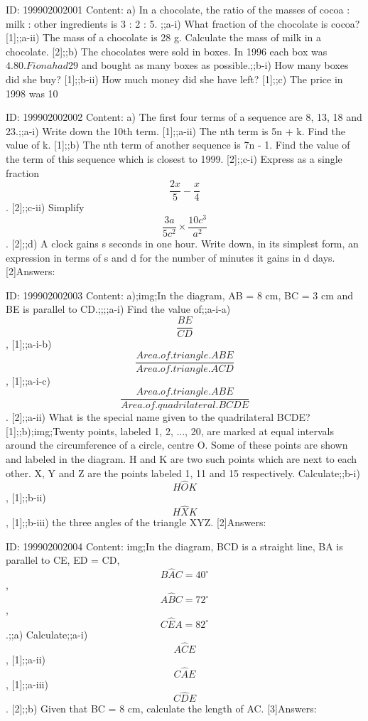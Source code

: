 \documentclass{article}
\begin{document}
ID: 199902002001
Content:
a) In a chocolate, the ratio of the masses of cocoa : milk : other ingredients is 3 : 2 : 5. ;;a-i) What fraction of the chocolate is cocoa? [1];;a-ii) The mass of a chocolate is 28 g. Calculate the mass of milk in a chocolate. [2];;b) The chocolates were sold in boxes. In 1996 each box was $4.80. Fiona had $29 and bought as many boxes as possible.;;b-i) How many boxes did she buy? [1];;b-ii) How much money did she have left? [1];;c) The price in 1998 was 10%

ID: 199902002002
Content:
a) The first four terms of a sequence are 8, 13, 18 and 23.;;a-i) Write down the 10th term. [1];;a-ii) The nth term is 5n + k. Find the value of k. [1];;b) The nth term of another sequence is 7n - 1. Find the value of the term of this sequence which is closest to 1999. [2];;c-i) Express as a single fraction $$\frac{2x}{5}-\frac{x}{4}$$. [2];;c-ii) Simplify $$\frac{3a}{5c^{2}} \times \frac{10c^{3}}{a^{2}}$$. [2];;d) A clock gains s seconds in one hour. Write down, in its simplest form, an expression in terms of s and d for the number of minutes it gains in d days. [2]Answers:

ID: 199902002003
Content:
a);img;In the diagram, AB = 8 cm, BC = 3 cm and BE is parallel to CD.;;;;a-i) Find the value of;;a-i-a) $$\frac{BE}{CD}$$, [1];;a-i-b) $$\frac{Area.of.triangle.ABE}{Area.of.triangle.ACD}$$, [1];;a-i-c) $$\frac{Area.of.triangle.ABE}{Area.of.quadrilateral.BCDE}$$. [2];;a-ii) What is the special name given to the quadrilateral BCDE? [1];;b);img;Twenty points, labeled 1, 2, ..., 20, are marked at equal intervals around the circumference of a circle, centre O. Some of these points are shown and labeled in the diagram. H and K are two such points which are next to each other. X, Y and Z are the points labeled 1, 11 and 15 respectively. Calculate;;b-i) $$H \hat OK$$, [1];;b-ii) $$H \hat XK$$, [1];;b-iii) the three angles of the triangle XYZ. [2]Answers:

ID: 199902002004
Content:
img;In the diagram, BCD is a straight line, BA is parallel to CE, ED = CD, $$B \hat AC=40^{\circ}$$, $$A \hat BC=72^{\circ}$$, $$C \hat EA=82^{\circ}$$.;;a) Calculate;;a-i) $$A \hat CE$$, [1];;a-ii) $$C \hat AE$$, [1];;a-iii) $$C \hat DE$$. [2];;b) Given that BC = 8 cm, calculate the length of AC. [3]Answers:
\end{document}
